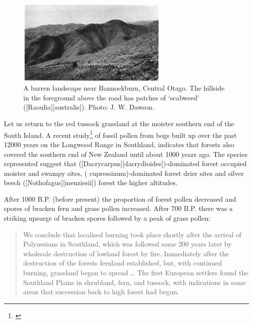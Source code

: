 \begin{figure}
	\centering
	\includegraphics[width=0.66\textwidth]{graphics/figure86barren.jpg}
	\caption[A barren landscape near Bannockburn]{A barren landscape near Bannockburn, Central Otago.
	The hillside in the foreground above the road has patches of `scabweed' ([Raoulia][australis]).
	Photo:  J. W. Dawson.}%
	\label{fig:86barren}
\end{figure}

Let us return to the red tussock grassland at the moister southern end of the South Island.
A recent study\footnote{\cite{mcglone1983vegetation}} of fossil pollen from bogs built up over the past 12000 years on the Longwood Range in Southland, indicates that forests also covered the southern end of New Zealand until about 1000 years ago.
The species represented suggest that  ([Dacrycarpus][dacrydioides])-dominated forest occupied moister and swampy sites,  ( cupressinum)-dominated forest drier sites and silver beech ([Nothofagus][menziesii]) forest the higher altitudes.

After 1000 B.P. (before present) the proportion of forest pollen decreased and spores of bracken fern and grass pollen increased.
After 700 B.P. there was a striking upsurge of bracken spores followed by a peak of grass pollen:

\begin{quote}
	We conclude that localised burning took place shortly after the arrival of Polynesians in Southland, which was followed some 200 years later by wholesale destruction of lowland forest by fire.
	Immediately after the destruction of the forests fernland established, but, with continued burning, grassland began to spread … The first European settlers found the Southland Plains in shrubland, fern, and tussock, with indications in some areas that succession back to high forest had begun.
\end{quote}

